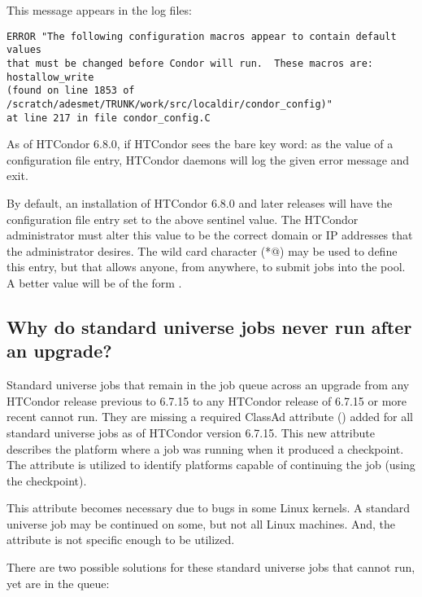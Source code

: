 This message appears in the log files:
\footnotesize
\begin{verbatim}
ERROR "The following configuration macros appear to contain default values 
that must be changed before Condor will run.  These macros are:
hostallow_write 
(found on line 1853 of /scratch/adesmet/TRUNK/work/src/localdir/condor_config)"
at line 217 in file condor_config.C
\end{verbatim}
\normalsize

As of HTCondor 6.8.0, if 
HTCondor sees the bare key word: 
as the value of a configuration file entry,
HTCondor daemons will log the given error message and exit.

By default, an installation of HTCondor 6.8.0 and later releases
will have the
configuration file entry  set to the above sentinel
value. 
The HTCondor administrator must alter this value to be the correct domain
or IP addresses that the administrator desires.
The wild card character (\verb@*@) may be used to define this entry,
but that allows anyone, from anywhere,
to submit jobs into the pool.
A better value will be of the form .

\subsection*{Why do standard universe jobs never run after an upgrade?}
\label{sec:checkpoint-platform-faq}

Standard universe jobs that remain in the job queue across an upgrade
from any HTCondor release previous to 6.7.15
to any HTCondor release of 6.7.15 or more recent
cannot run.
They are missing a required ClassAd attribute
() added for
all standard universe jobs as of HTCondor version 6.7.15.
This new attribute describes the platform where a job was
running when it produced a checkpoint.
The attribute is utilized to identify platforms capable of 
continuing the job (using the checkpoint).

This attribute becomes necessary due to bugs in some Linux kernels.
A standard universe job may be continued on some, but not all
Linux machines.
And, the  attribute is not specific enough
to be utilized.

There are two possible solutions for these standard universe jobs that
cannot run, yet are in the queue:

